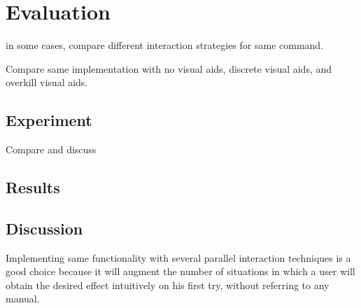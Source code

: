 

\chapter{Evaluation}

in some cases, compare different interaction strategies for same command.

Compare same implementation with no visual aids, discrete visual aids, and overkill visual aids.

\section{Experiment}

Compare and discuss

\section{Results}

\section{Discussion}

Implementing same functionality with several parallel interaction techniques is a good choice because it will augment the number of situations in which a user will obtain the desired effect intuitively on his first try, without referring to any manual.